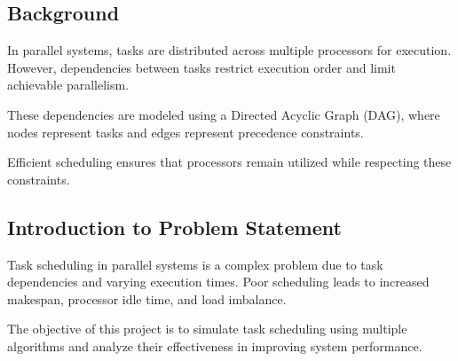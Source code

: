 \documentclass[12pt,a4paper]{article}
\begin{document}
	\subsection{Background}
		In parallel systems, tasks are distributed across multiple processors for execution. However, dependencies between tasks restrict execution order and limit achievable parallelism.

These dependencies are modeled using a Directed Acyclic Graph (DAG), where nodes represent tasks and edges represent precedence constraints.

Efficient scheduling ensures that processors remain utilized while respecting these constraints.



		\subsection{Introduction to Problem Statement}
		Task scheduling in parallel systems is a complex problem due to task dependencies and varying execution times. Poor scheduling leads to increased makespan, processor idle time, and load imbalance.

The objective of this project is to simulate task scheduling using multiple algorithms and analyze their effectiveness in improving system performance.



		
		
    
    

    
	\newpage
	
\end{document}
